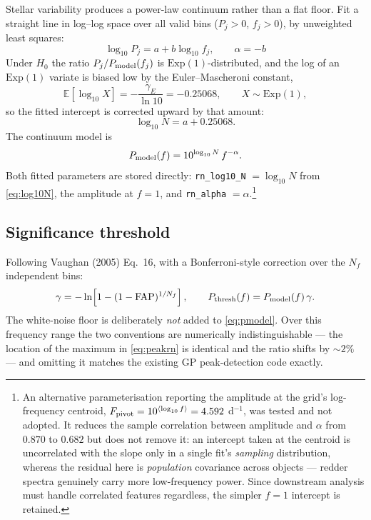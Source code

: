 \documentclass[11pt]{article}
\begin{document}
Stellar variability produces a power-law continuum rather than a flat floor. Fit a
straight line in log--log space over all valid bins
($P_j > 0$, $f_j > 0$), by unweighted least squares:
%
\begin{equation}
  \log_{10} P_j = a + b \log_{10} f_j ,
  \qquad
  \alpha = -b
  \label{eq:rnfit}
\end{equation}
%
Under $H_0$ the ratio $P_j / P_{\rm model}(f_j)$ is $\mathrm{Exp}(1)$-distributed, and
the log of an $\mathrm{Exp}(1)$ variate is biased low by the Euler--Mascheroni constant,
%
\begin{equation}
  \mathbb{E}\!\left[\log_{10} X\right] = -\frac{\gamma_E}{\ln 10} = -0.25068,
  \qquad X \sim \mathrm{Exp}(1),
  \label{eq:biascorr}
\end{equation}
%
so the fitted intercept is corrected upward by that amount:
%
\begin{equation}
  \log_{10} N = a + 0.25068 .
  \label{eq:log10N}
\end{equation}
%
The continuum model is
%
\begin{equation}
  P_{\rm model}(f) = 10^{\log_{10} N} \, f^{-\alpha} .
  \label{eq:pmodel}
\end{equation}
%
Both fitted parameters are stored directly: \texttt{rn\_log10\_N} $= \log_{10} N$ from
\eqref{eq:log10N}, the amplitude at $f = 1$, and \texttt{rn\_alpha} $= \alpha$.\footnote{%
An alternative parameterisation reporting the amplitude at the grid's log-frequency
centroid, $F_{\rm pivot} = 10^{\langle \log_{10} f\rangle} = 4.592$ d$^{-1}$, was tested
and not adopted.  It reduces the sample correlation between amplitude and $\alpha$ from
$0.870$ to $0.682$ but does not remove it: an intercept taken at the centroid is
uncorrelated with the slope only in a single fit's \emph{sampling} distribution, whereas
the residual here is \emph{population} covariance across objects --- redder spectra
genuinely carry more low-frequency power.  Since downstream analysis must handle
correlated features regardless, the simpler $f = 1$ intercept is retained.}

\subsection{Significance threshold}

Following Vaughan (2005) Eq.~16, with a Bonferroni-style correction over the $N_f$
independent bins:
%
\begin{equation}
  \gamma = -\ln\!\left[1 - (1-\mathrm{FAP})^{1/N_f}\right],
  \qquad
  P_{\rm thresh}(f) = P_{\rm model}(f)\,\gamma .
  \label{eq:rnthresh}
\end{equation}
%
The white-noise floor is deliberately \emph{not} added to \eqref{eq:pmodel}. Over this
frequency range the two conventions are numerically indistinguishable --- the location
of the maximum in \eqref{eq:peakrn} is identical and the ratio shifts by $\sim2\%$ ---
and omitting it matches the existing GP peak-detection code exactly.
\end{document}
